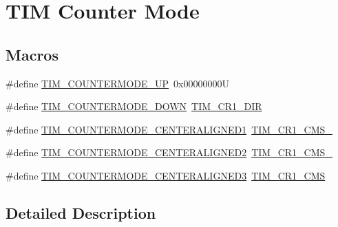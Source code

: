\hypertarget{group___t_i_m___counter___mode}{}\section{T\+IM Counter Mode}
\label{group___t_i_m___counter___mode}
\subsection*{Macros}
\begin{DoxyCompactItemize}
\item 
\#define \mbox{\hyperlink{group___t_i_m___counter___mode_ga9eb9ab91119c2c76d4db453d599c0b7d}{T\+I\+M\+\_\+\+C\+O\+U\+N\+T\+E\+R\+M\+O\+D\+E\+\_\+\+UP}}~0x00000000U
\item 
\#define \mbox{\hyperlink{group___t_i_m___counter___mode_ga5f590fdd7c41df7180b870bb76ff691c}{T\+I\+M\+\_\+\+C\+O\+U\+N\+T\+E\+R\+M\+O\+D\+E\+\_\+\+D\+O\+WN}}~\mbox{\hyperlink{group___peripheral___registers___bits___definition_gacea10770904af189f3aaeb97b45722aa}{T\+I\+M\+\_\+\+C\+R1\+\_\+\+D\+IR}}
\item 
\#define \mbox{\hyperlink{group___t_i_m___counter___mode_ga26d8e5236c35d85c2abaa482b5ec6746}{T\+I\+M\+\_\+\+C\+O\+U\+N\+T\+E\+R\+M\+O\+D\+E\+\_\+\+C\+E\+N\+T\+E\+R\+A\+L\+I\+G\+N\+E\+D1}}~\mbox{\hyperlink{group___peripheral___registers___bits___definition_ga83ca6f7810aba73dc8c12f22092d97a2}{T\+I\+M\+\_\+\+C\+R1\+\_\+\+C\+M\+S\+\_}}
\item 
\#define \mbox{\hyperlink{group___t_i_m___counter___mode_gae4517c68086ffa61a694576cec8fe634}{T\+I\+M\+\_\+\+C\+O\+U\+N\+T\+E\+R\+M\+O\+D\+E\+\_\+\+C\+E\+N\+T\+E\+R\+A\+L\+I\+G\+N\+E\+D2}}~\mbox{\hyperlink{group___peripheral___registers___bits___definition_gab3ee4adcde3c001d3b97d2eae1730ea9}{T\+I\+M\+\_\+\+C\+R1\+\_\+\+C\+M\+S\+\_}}
\item 
\#define \mbox{\hyperlink{group___t_i_m___counter___mode_gaf0c3edf6ea1ade3520ab4970e1fc6e92}{T\+I\+M\+\_\+\+C\+O\+U\+N\+T\+E\+R\+M\+O\+D\+E\+\_\+\+C\+E\+N\+T\+E\+R\+A\+L\+I\+G\+N\+E\+D3}}~\mbox{\hyperlink{group___peripheral___registers___bits___definition_ga352b3c389bde13dd6049de0afdd874f1}{T\+I\+M\+\_\+\+C\+R1\+\_\+\+C\+MS}}
\end{DoxyCompactItemize}


\subsection{Detailed Description}


